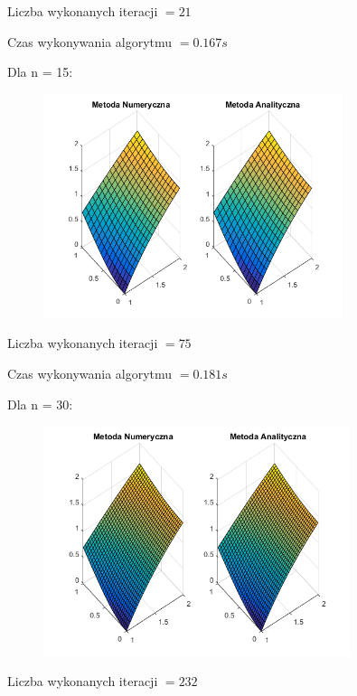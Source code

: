 Liczba wykonanych iteracji $ = 21 $

Czas wykonywania algorytmu $ = 0.167 s$

Dla n = 15:

\begin{figure}[!ht]
	\begin{center}
		\includegraphics[width=0.78\textwidth]{Lab6/charts/gs/zad1/15.png}
	\end{center}
\end{figure}
Liczba wykonanych iteracji $ = 75 $

Czas wykonywania algorytmu $ = 0.181 s$

\newpage
Dla n = 30:

\begin{figure}[!ht]
	\begin{center}
		\includegraphics[width=0.8\textwidth]{Lab6/charts/gs/zad1/30.png}
	\end{center}
\end{figure}

Liczba wykonanych iteracji $ = 232 $

